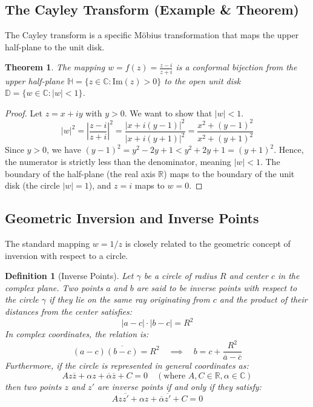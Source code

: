\documentclass[12pt,a4paper]{article}
\newtheorem{theorem}{Theorem}[section]
\newtheorem{definition}{Definition}[section]
\begin{document}
\subsection{The Cayley Transform (Example \& Theorem)}
The Cayley transform is a specific M\"obius transformation that maps the upper half-plane to the unit disk.
\begin{theorem}
The mapping $w = f(z) = \frac{z - i}{z + i}$ is a conformal bijection from the upper half-plane $\mathbb{H} = \{z \in \mathbb{C} : \text{Im}(z) > 0\}$ to the open unit disk $\mathbb{D} = \{w \in \mathbb{C} : |w| < 1\}$.
\end{theorem}
\begin{proof}
Let $z = x + iy$ with $y > 0$. We want to show that $|w| < 1$.
\begin{equation}
    |w|^2 = \left| \frac{z - i}{z + i} \right|^2 = \frac{|x + i(y-1)|^2}{|x + i(y+1)|^2} = \frac{x^2 + (y-1)^2}{x^2 + (y+1)^2}
\end{equation}
Since $y > 0$, we have $(y-1)^2 = y^2 - 2y + 1 < y^2 + 2y + 1 = (y+1)^2$. Hence, the numerator is strictly less than the denominator, meaning $|w| < 1$. The boundary of the half-plane (the real axis $\mathbb{R}$) maps to the boundary of the unit disk (the circle $|w| = 1$), and $z = i$ maps to $w = 0$.
\end{proof}

\subsection{Geometric Inversion and Inverse Points}
The standard mapping $w = 1/z$ is closely related to the geometric concept of inversion with respect to a circle.
\begin{definition}[Inverse Points]
Let $\gamma$ be a circle of radius $R$ and center $c$ in the complex plane. Two points $a$ and $b$ are said to be inverse points with respect to the circle $\gamma$ if they lie on the same ray originating from $c$ and the product of their distances from the center satisfies:
\begin{equation}
    |a - c| \cdot |b - c| = R^2
\end{equation}
In complex coordinates, the relation is:
\begin{equation}
    (a - c)\overline{(b - c)} = R^2 \quad \implies \quad b = c + \frac{R^2}{\overline{a} - \overline{c}}
\end{equation}
Furthermore, if the circle is represented in general coordinates as:
\begin{equation}
    A z\overline{z} + \alpha z + \overline{\alpha}\overline{z} + C = 0 \quad (\text{where } A, C \in \mathbb{R}, \alpha \in \mathbb{C})
\end{equation}
then two points $z$ and $z'$ are inverse points if and only if they satisfy:
\begin{equation}
    A z\overline{z'} + \alpha z + \overline{\alpha}\overline{z'} + C = 0
\end{equation}
\end{definition}
\end{document}
